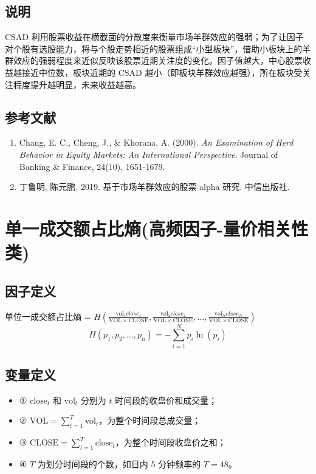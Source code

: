 \documentclass{article}
\begin{document}
\subsection{说明}
CSAD 利用股票收益在横截面的分散度来衡量市场羊群效应的强弱；为了让因子对个股有选股能力，将与个股走势相近的股票组成“小型板块”，借助小板块上的羊群效应的强弱程度来近似反映该股票近期关注度的变化。因子值越大，中心股票收益越接近中位数，板块近期的 CSAD 越小（即板块羊群效应越强），所在板块受关注程度提升越明显，未来收益越高。

\subsection{参考文献}
\begin{enumerate}
    \item Chang, E. C., Cheng, J., \& Khorana, A. (2000). \textit{An Examination of Herd Behavior in Equity Markets: An International Perspective}. Journal of Banking \& Finance, 24(10), 1651-1679.
    \item 丁鲁明, 陈元鹏. 2019. 基于市场羊群效应的股票 alpha 研究. 中信出版社.
\end{enumerate}

\section{单一成交额占比熵(高频因子-量价相关性类)}

\subsection{因子定义}
单位一成交额占比熵 = \( H\left(\frac{\mathrm{vol}_1close_1 }{\mathrm{VOL} \times \mathrm{CLOSE}}, \frac{\mathrm{vol}_2close_2}{\mathrm{VOL} \times \mathrm{CLOSE}}, \dots, \frac{\mathrm{vol}_Nclose_N}{\mathrm{VOL} \times \mathrm{CLOSE}}\right) \)
\begin{equation}
    H(p_1, p_2, \dots, p_n) = -\sum_{i=1}^N p_i \ln(p_i)
\end{equation}

\subsection{变量定义}
\begin{itemize}
    \item ① \(\mathrm{close}_t\) 和 \(\mathrm{vol}_t\) 分别为 \(t\) 时间段的收盘价和成交量；
    \item ② \(\displaystyle \mathrm{VOL} = \sum_{t=1}^T \mathrm{vol}_t\)，为整个时间段总成交量；
    \item ③ \(\displaystyle \mathrm{CLOSE} = \sum_{t=1}^T \mathrm{close}_t\)，为整个时间段收盘价之和；
    \item ④ \(T\) 为划分时间段的个数，如日内 5 分钟频率的 \(T=48\)。
\end{itemize}
\end{document}
